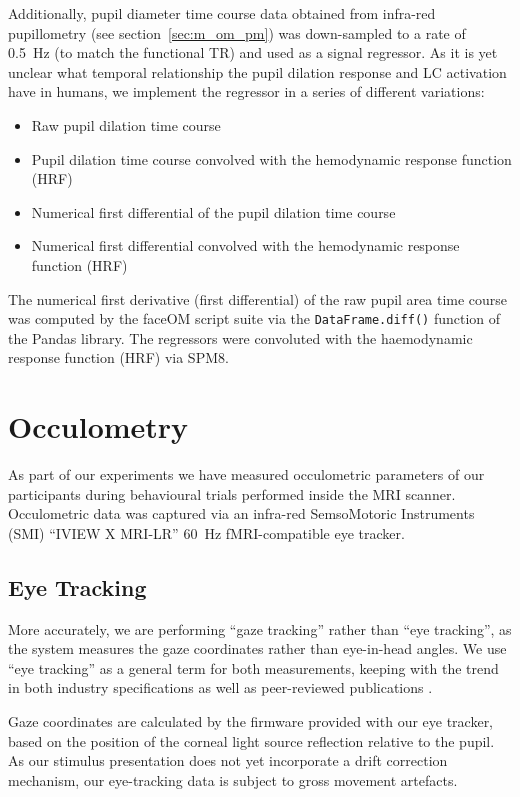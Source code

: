 	    Additionally, pupil diameter time course data obtained from infra-red pupillometry (see section~\ref{sec:m_om_pm}) was down-sampled to a rate of \SI{0.5}{\hertz} (to match the functional TR) and used as a signal regressor.
	    As it is yet unclear what temporal relationship the pupil dilation response and LC activation have in humans, we implement the regressor in a series of different variations:
	    \begin{itemize}
		\item Raw pupil dilation time course
		\item Pupil dilation time course convolved with the hemodynamic response function (HRF)
		\item Numerical first differential of the pupil dilation time course
		\item Numerical first differential convolved with the hemodynamic response function (HRF)
	    \end{itemize}
	    
	    The numerical first derivative (first differential) of the raw pupil area time course was computed by the faceOM script suite via the \colorbox{vlg}{\texttt{DataFrame.diff()}} function of the Pandas \citep{pandas} library.
	    The regressors were convoluted with the haemodynamic response function (HRF) via SPM8.
    \section{Occulometry}\label{sec:m_om}
	As part of our experiments we have measured occulometric parameters of our participants during behavioural trials performed inside the MRI scanner.
	Occulometric data was captured via an infra-red SemsoMotoric Instruments (SMI) “IVIEW X\textsuperscript{\small\texttrademark} MRI-LR” \SI{60}{\hertz} fMRI-compatible eye tracker.
	\subsection{Eye Tracking}\label{sec:m_om_et}
	    More accurately, we are performing “gaze tracking” rather than “eye tracking”, as the system measures the gaze coordinates rather than eye-in-head angles.
	    We use “eye tracking” as a general term for both measurements, keeping with the trend in both industry specifications \citep{Bojko2006} as well as peer-reviewed publications \citep{Kirk2013}.
	    
	    Gaze coordinates are calculated by the firmware provided with our eye tracker, based on the position of the corneal light source reflection relative to the pupil.
	    As our stimulus presentation does not yet incorporate a drift correction mechanism, our eye-tracking data is subject to gross movement artefacts.
